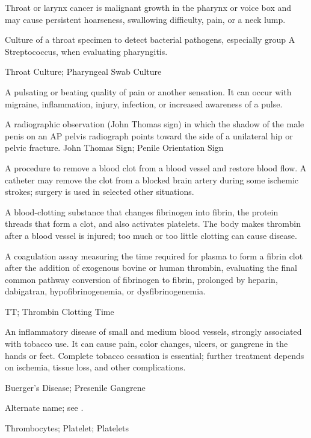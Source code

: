  Throat or larynx cancer is malignant growth in the pharynx or voice box and may cause persistent hoarseness, swallowing difficulty, pain, or a neck lump.

 Culture of a throat specimen to detect bacterial pathogens, especially group A Streptococcus, when evaluating pharyngitis.

\synonyms
Throat Culture; Pharyngeal Swab Culture

 A pulsating or beating quality of pain or another sensation. It can occur with migraine, inflammation, injury, infection, or increased awareness of a pulse.

 A radiographic observation (John Thomas sign) in which the shadow of the male penis on an AP pelvis radiograph points toward the side of a unilateral hip or pelvic fracture.
\synonyms
John Thomas Sign; Penile Orientation Sign

 A procedure to remove a blood clot from a blood vessel and restore blood flow. A catheter may remove the clot from a blocked brain artery during some ischemic strokes; surgery is used in selected other situations.

 A blood-clotting substance that changes fibrinogen into fibrin, the protein threads that form a clot, and also activates platelets. The body makes thrombin after a blood vessel is injured; too much or too little clotting can cause disease.

 A coagulation assay measuring the time required for plasma to form a fibrin clot after the addition of exogenous bovine or human thrombin, evaluating the final common pathway conversion of fibrinogen to fibrin, prolonged by heparin, dabigatran, hypofibrinogenemia, or dysfibrinogenemia.

\synonyms
TT; Thrombin Clotting Time

 An inflammatory disease of small and medium blood vessels, strongly associated with tobacco
use. It can cause pain, color changes, ulcers, or gangrene in the hands or feet. Complete
tobacco cessation is essential; further treatment depends on ischemia, tissue loss, and
other complications.

\synonyms
Buerger's Disease; Presenile Gangrene

 Alternate name; see .

\synonyms
Thrombocytes; Platelet; Platelets

